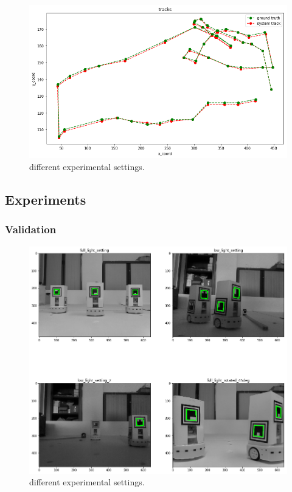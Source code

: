 \documentclass[a4paper]{report}
\begin{document}
\begin{figure}[H]
    \centering
    \includegraphics[width=1.0\textwidth]{tracks.png}
    \caption{different experimental settings.}
    \label{fig:track}
\end{figure}

\subsection{Experiments}

\subsubsection{Validation}

\begin{figure}[H]
    \centering
    \includegraphics[width=1.0\textwidth]{fulll.png}
    \caption{different experimental settings.}
    \label{fig:sett}
\end{figure}
\end{document}
